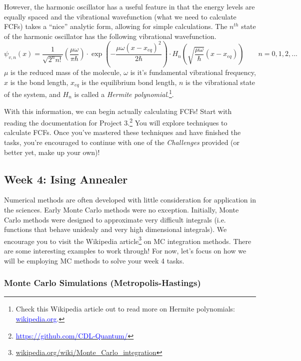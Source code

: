 \documentclass[12pt]{article}
\begin{document}
However, the harmonic oscillator has a useful feature in that the energy levels are equally spaced and the vibrational wavefunction (what we need to calculate FCFs) takes a ``nice'' analytic form, allowing for simple calculations. The $n^{th}$ state of the harmonic oscillator has the following vibrational wavefunction.
\begin{equation}
    \psi_{v,n}(x) = \frac{1}{\sqrt{2^nn!}}\left(\frac{\mu\omega}{\pi\hbar}\right)\cdot\exp\left(-\frac{\mu\omega (x-x_{eq})^2}{2\hbar}\right)\cdot H_n\left(\sqrt{\frac{\mu\omega}{\hbar}}(x-x_{eq})\right) \qquad n=0,1,2,...
\end{equation}
$\mu$ is the reduced mass of the molecule, $\omega$ is it's fundamental vibrational frequency, $x$ is the bond length, $x_{eq}$ is the equilibrium bond length, $n$ is the vibrational state of the system, and $H_n$ is called a {\it Hermite polynomial}.\footnote{Check this Wikipedia article out to read more on Hermite polynomials: \href{https://en.wikipedia.org/wiki/Hermite_polynomials}{\textcolor{blue}{wikipedia.org}}.}.

With this information, we can begin actually calculating FCFs! Start with reading the documentation for Project 3.\footnote{\href{https://github.com/CDL-Quantum/CohortProject_2020/tree/master/Project_3_Franck_Condon_Factors}
    {\textcolor{blue}{https://github.com/CDL-Quantum/}}}
You will explore techniques to calculate FCFs.
Once you've mastered these techniques and have finished the tasks, you're encouraged to continue with one of the {\it Challenges} provided (or better yet, make up your own)!

\subsection{Week 4: Ising Annealer}

Numerical methods are often developed with little consideration for application in the sciences. Early Monte Carlo methods were no exception. Initially, Monte Carlo methods were designed to approximate very difficult integrals (i.e. functions that behave unidealy and very high dimensional integrals). We encourage you to visit the Wikipedia article\footnote{\href{http://en.wikipedia.org/wiki/Monte\_Carlo\_integration}{wikipedia.org/wiki/Monte\_Carlo\_integration}} on MC integration methods. There are some interesting examples to work through! For now, let's focus on how we will be employing MC methods to solve your week 4 tasks. 

\subsubsection{Monte Carlo Simulations (Metropolis-Hastings)}
\end{document}

